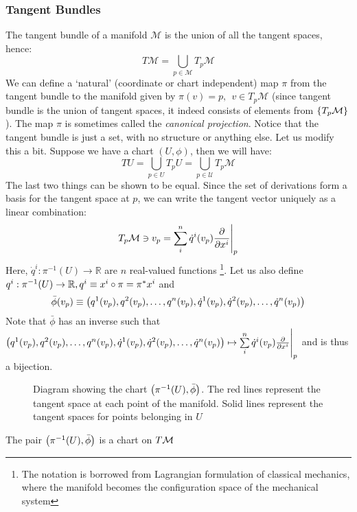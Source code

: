 \subsubsection{Tangent Bundles}
The tangent bundle of a manifold $\mathcal{M}$ is the union of all the tangent spaces, hence: 
$$T\mathcal{M} = \bigcup\limits_{p\in \mathcal{M}}T_p\mathcal{M}$$
We can define a `natural' (coordinate or chart independent) map $\pi$ from the tangent bundle to the manifold given by $\pi(v) = p, \ \ v \in T_p\mathcal{M}$ (since tangent bundle is the union of tangent spaces, it indeed consists of elements from $\{T_p\mathcal M\}$). The map $\pi$ is sometimes called the \textit{canonical projection}.
Notice that the tangent bundle is just a set, with no structure or anything else. Let us modify this a bit. Suppose we have a chart $(U,\phi)$, then we will have:
$$TU =  \bigcup\limits_{p\in {U}}T_p{U}= \bigcup\limits_{p\in \mathcal{U}}T_p\mathcal{M}$$ 
The last two things can be shown to be equal. Since the set of derivations form a basis for the tangent space at $p$, we can write the tangent vector uniquely as a linear combination:
$$T_p\mathcal{M}\ni v_p = \sum\limits_{i}^n \dot{q}^i(v_p) \pdv{x^i}\Bigg|_p$$
Here, $\dot{q}^i: \pi^{-1}(U)\rightarrow \mathbb{R}$ are $n$ real-valued functions \footnote{The notation is borrowed from Lagrangian formulation of classical mechanics, where the manifold becomes the configuration space of the mechanical system}. Let us also define $q^i:\pi^{-1}(U)\rightarrow \mathbb{R}, {q}^i\equiv x^i\circ \pi = \pi^*x^i$ and 
$$\bar{\phi}(v_p)\equiv \left( q^1(v_p), q^2(v_p),\ldots,q^n(v_p),\dot{q}^1(v_p), \dot{q}^2(v_p),\ldots,\dot{q}^n(v_p) \right)$$ 
Note that $\bar{\phi}$ has an inverse such that $\left( q^1(v_p), q^2(v_p),\ldots,q^n(v_p),\dot{q}^1(v_p), \dot{q}^2(v_p),\ldots,\dot{q}^n(v_p) \right) \mapsto \sum\limits_{i}^n \dot{q}^i(v_p) \pdv{x^i}\Bigg|_p$ and is thus a bijection. 
\begin{figure}[H]
  \centering 
  
  \caption{Diagram showing the chart $\left( \pi^{-1}(U),\bar{\phi} \right)$. The red lines represent the tangent space at each point of the manifold. Solid lines represent the tangent spaces for points belonging in $U$}
\end{figure}
\begin{lemma}
  The pair $\left( \pi^{-1}(U),\bar{\phi} \right)$ is a chart on $T\mathcal M$
\end{lemma}
